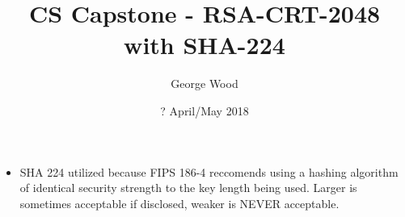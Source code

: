 \documentclass[11pt]{article}
\title{CS Capstone - RSA-CRT-2048 with SHA-224}
\author{George Wood}
\date{? April/May 2018}
\begin{document}
\maketitle

\thispagestyle{empty}

\section{}
\begin{itemize}
\item SHA 224 utilized because FIPS 186-4 reccomends using a hashing algorithm of identical security strength to the key length being used. Larger is sometimes acceptable if disclosed, weaker is NEVER acceptable.
\end{itemize}
\end{document}
